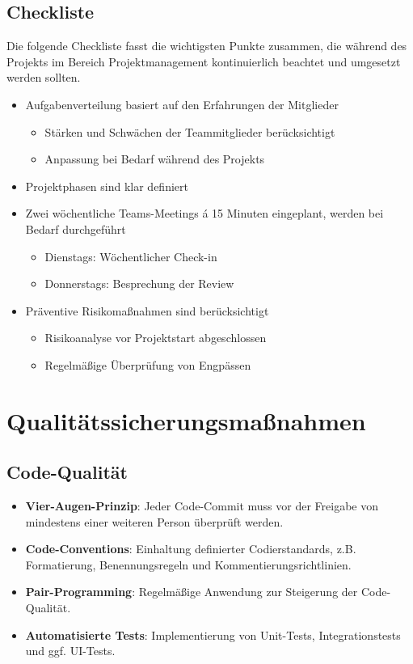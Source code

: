 \documentclass[a4paper,12pt]{article}
\begin{document}
    \subsection{Checkliste}
    Die folgende Checkliste fasst die wichtigsten Punkte zusammen, die während des Projekts im Bereich Projektmanagement kontinuierlich beachtet und umgesetzt werden sollten.
    \begin{itemize}[label=\textbf{X}]
        \item Aufgabenverteilung basiert auf den Erfahrungen der Mitglieder
        \begin{itemize}
            \item Stärken und Schwächen der Teammitglieder berücksichtigt
            \item Anpassung bei Bedarf während des Projekts
        \end{itemize}
        \item Projektphasen sind klar definiert
        \item Zwei wöchentliche Teams-Meetings á 15 Minuten eingeplant, werden bei Bedarf durchgeführt
        \begin{itemize}
            \item Dienstags: Wöchentlicher Check-in
            \item Donnerstags: Besprechung der Review
        \end{itemize}
        \item Präventive Risikomaßnahmen sind berücksichtigt
        \begin{itemize}
            \item Risikoanalyse vor Projektstart abgeschlossen
            \item Regelmäßige Überprüfung von Engpässen
        \end{itemize}
    \end{itemize}
    

\newpage

\section{Qualitätssicherungsmaßnahmen}
\subsection{Code-Qualität}
\begin{itemize}
    \item \textbf{Vier-Augen-Prinzip}: Jeder Code-Commit muss vor der Freigabe von mindestens einer weiteren Person überprüft werden.
    \item \textbf{Code-Conventions}: Einhaltung definierter Codierstandards, z.B. Formatierung, Benennungsregeln und Kommentierungsrichtlinien.
    \item \textbf{Pair-Programming}: Regelmäßige Anwendung zur Steigerung der Code-Qualität.
    \item \textbf{Automatisierte Tests}: Implementierung von Unit-Tests, Integrationstests und ggf. UI-Tests. \cite{helmold_projektmanagement_2023}

\end{itemize}
\end{document}
